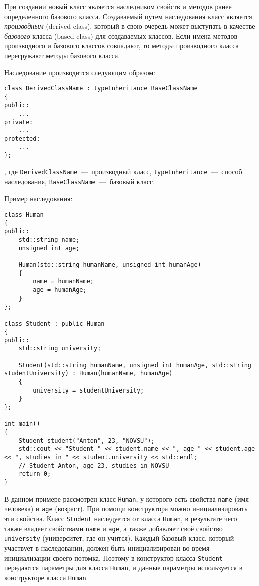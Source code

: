 При создании новый класс является наследником свойств и методов ранее определенного базового класса. Создаваемый путем наследования класс является \emph{производным} (derived class), который в свою очередь может выступать в качестве \emph{базового} класса (based class) для создаваемых классов. Если имена методов производного и базового классов совпадают, то методы производного класса перегружают методы базового класса.

Наследование производится следующим образом:

\begin{lstlisting}
class DerivedClassName : typeInheritance BaseClassName
{
public:
    ...
private:
    ...
protected:
    ...
};
\end{lstlisting}

, где \lstinline|DerivedClassName|~---~производный класс, \lstinline|typeInheritance|~---~способ наследования, \lstinline|BaseClassName|~---~базовый класс.

Пример наследования:
\begin{lstlisting}
class Human
{
public:
    std::string name;
    unsigned int age;

    Human(std::string humanName, unsigned int humanAge)
    {
        name = humanName;
        age = humanAge;
    }
};

class Student : public Human
{
public:
    std::string university;

    Student(std::string humanName, unsigned int humanAge, std::string studentUniversity) : Human(humanName, humanAge)
    {
        university = studentUniversity;
    }
};

int main()
{
    Student student("Anton", 23, "NOVSU");
    std::cout << "Student " << student.name << ", age " << student.age << ", studies in " << student.university << std::endl;
    // Student Anton, age 23, studies in NOVSU
    return 0;
}
\end{lstlisting}

В данном примере рассмотрен класс \lstinline|Human|, у которого есть свойства \lstinline|name| (имя человека) и \lstinline|age| (возраст). При помощи конструктора можно инициализировать эти свойства. Класс \lstinline|Student| наследуется от класса \lstinline|Human|, в результате чего также владеет свойствами \lstinline|name| и \lstinline|age|, а также добавляет своё свойство \lstinline|university| (университет, где он учится). Каждый базовый класс, который участвует в наследовании, должен быть инициализирован во время инициализации своего потомка. Поэтому в конструктор класса \lstinline|Student| передаются параметры для класса \lstinline|Human|, и данные параметры используется в конструкторе класса \lstinline|Human|.

